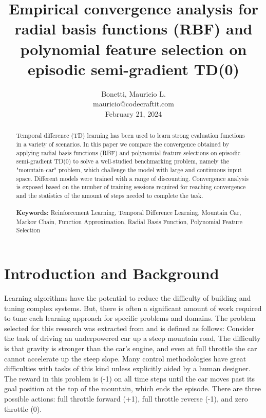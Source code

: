 \documentclass[10pt,twocolumn]{article}
\begin{document}
\title{Empirical convergence analysis for radial basis functions (RBF) and polynomial feature selection on episodic semi-gradient TD(0)}

\author{Bonetti, Mauricio L.\\
mauricio@codecraftit.com\\
February 21, 2024 \\
}

\maketitle
\thispagestyle{empty}

\begin{abstract}
Temporal difference (TD) learning has been used to learn strong evaluation functions in a variety of scenarios. In this paper we compare the convergence obtained 
by applying radial basis functions (RBF) and polynomial feature selections on episodic semi-gradient TD(0) to solve 
a well-studied benchmarking problem, namely the "mountain-car" problem, which challenge the model with large 
and continuous input space. Different models were trained with a range of discounting. Convergence analysis is exposed based 
on the number of training sessions required for reaching convergence and the statistics of the amount of steps needed to complete the task.
\\ \\\textbf{Keywords:} Reinforcement Learning, Temporal Difference Learning, Mountain Car, Markov Chain, Function Approximation, Radial Basis Function, Polynomial Feature Selection
\end{abstract}

\section{Introduction and Background}
Learning algorithms have the potential to reduce the difficulty of building and
tuning complex systems. But, there is often a significant amount of work required
to tune each learning approach for specific problems and domains. \cite{Feature_Construction}
The problem selected for this research was extracted from \cite{Sutton1998} and is defined as follows:
Consider the task of driving an underpowered car up a steep mountain road, The difficulty is that gravity is stronger
than the car’s engine, and even at full throttle the car cannot accelerate up the steep slope.
Many control methodologies have great difficulties with tasks of this kind unless explicitly aided by a
human designer. The reward in this problem is (-1) on all time steps until the car moves past its goal
position at the top of the mountain, which ends the episode. There are three possible
actions: full throttle forward (+1), full throttle reverse (-1), and zero throttle (0). 
\end{document}
